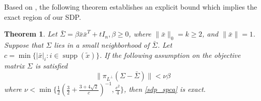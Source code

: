 \documentclass[11pt]{amsart}
\theoremstyle{plain}
\newtheorem{thm}{Theorem}[section]
\theoremstyle{definition}
\theoremstyle{remark}
\DeclareMathOperator{\supp}{supp}
\begin{document}
	Based on , the following theorem establishes an explicit bound which implies the exact region of our SDP.  
	
	\begin{thm}\label{thm:stable_sdp}
		Let $\bar \Sigma = \beta \bar x \bar x^T+tI_n,\beta\geq0$, where $\|\bar x\|_0=k\geq 2$, and $\|\bar x\|=1$. Suppose that $\Sigma$ lies in a small neighborhood of $\bar \Sigma$. Let $c = \min\{| \bar x|_i: i \in \supp(\tilde x)\}$. If the following assumption on the objective matrix $\Sigma$ is satisfied
		\begin{equation}\label{eq:spca_threshold}
			\|\pi_{L^\perp}(\Sigma - \bar \Sigma)\| < \nu\beta  
		\end{equation}
		where \(\nu < \min\big\{ \tfrac{1}{2}(\frac{3}{2} + \frac{3 + 4\sqrt{2}}{c})^{-1},\tfrac{c^2}{4}\big\}\), then \eqref{sdp_spca} is exact. 
	\end{thm}
	
\end{document}

